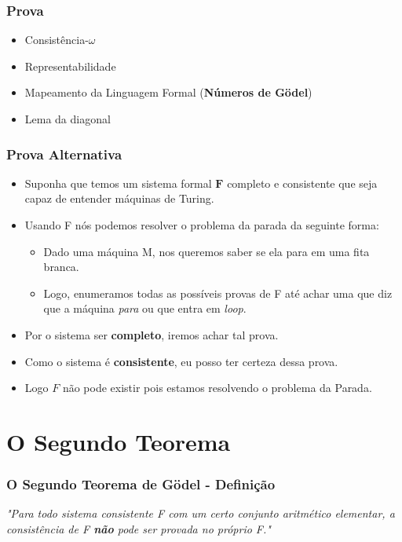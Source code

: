\documentclass{beamer}
\begin{document}
\begin{frame}
    \frametitle{Prova}

    \begin{itemize}
        \item Consistência-$\omega$
        \item Representabilidade
        \item Mapeamento da Linguagem Formal (\textbf{Números de Gödel})
        \item Lema da diagonal
    \end{itemize}
\end{frame}

\begin{frame}
    \frametitle{Prova Alternativa}

    \begin{itemize}
        \item[] Suponha que temos um sistema formal $\textbf{F}$ completo e consistente que seja capaz de entender máquinas de Turing.
        \item[] Usando F nós podemos resolver o problema da parada da seguinte forma:
            \begin{itemize}
                \item Dado uma máquina M, nos queremos saber se ela para em uma fita branca.
                \item Logo, enumeramos todas as possíveis provas de F até achar uma que diz que a máquina \textit{para} ou que entra em \textit{loop}.
            \end{itemize}
        \item[] Por o sistema ser \textbf{completo}, iremos achar tal prova.
        \item[] Como o sistema é \textbf{consistente}, eu posso ter certeza dessa prova.
        \item[] Logo $F$ não pode existir pois estamos resolvendo o problema da Parada.
    \end{itemize}

\end{frame}

%
%

\section{O Segundo Teorema}
\begin{frame}
    \frametitle{O Segundo Teorema de Gödel - Definição}

    \begin{center}
        \textit{"Para todo sistema consistente F com um certo conjunto aritmético elementar, a consistência de F \textbf{\textit{não}} pode ser provada no próprio F."}
    \end{center}
\end{frame}
\end{document}
